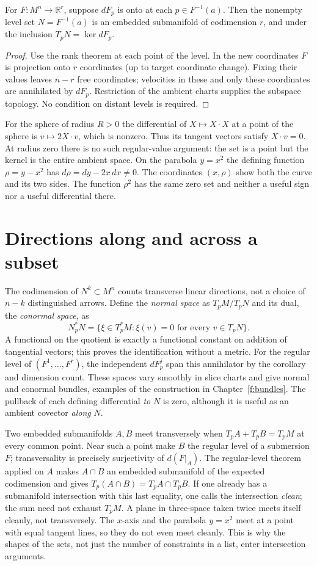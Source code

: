 \begin{corollary}\label{f:regular-value}
For $F:M^n\to\mathbb R^r$, suppose $dF_p$ is onto at each $p\in F^{-1}(a)$. Then the nonempty level set $N=F^{-1}(a)$ is an embedded submanifold of codimension $r$, and under the inclusion $T_pN=\ker dF_p$.
\end{corollary}
\begin{proof}
Use the rank theorem at each point of the level. In the new coordinates $F$ is projection onto $r$ coordinates (up to target coordinate change). Fixing their values leaves $n-r$ free coordinates; velocities in these and only these coordinates are annihilated by $dF_p$. Restriction of the ambient charts supplies the subspace topology. No condition on distant levels is required.
\end{proof}
For the sphere of radius $R>0$ the differential of $X\mapsto X\cdot X$ at a point of the sphere is $v\mapsto2X\cdot v$, which is nonzero. Thus its tangent vectors satisfy $X\cdot v=0$. At radius zero there is no such regular-value argument: the set is a point but the kernel is the entire ambient space. On the parabola $y=x^2$ the defining function $\rho=y-x^2$ has $d\rho=dy-2x\,dx\ne0$. The coordinates $(x,\rho)$ show both the curve and its two sides. The function $\rho^2$ has the same zero set and neither a useful sign nor a useful differential there.

\section{Directions along and across a subset}\label{f:normal}
The codimension of $N^k\subset M^n$ counts transverse linear directions, not a choice of $n-k$ distinguished arrows. Define the \emph{normal space} as $T_pM/T_pN$ and its dual, the \emph{conormal space}, as
\[
 N^*_pN=\{\xi\in T_p^*M:\xi(v)=0\text{ for every }v\in T_pN\} .
\]
A functional on the quotient is exactly a functional constant on addition of tangential vectors; this proves the identification without a metric. For the regular level of $(F^1,\ldots,F^r)$, the independent $dF^j_p$ span this annihilator by the corollary and dimension count. These spaces vary smoothly in slice charts and give normal and conormal bundles, examples of the construction in Chapter~\ref{f:bundles}. The pullback of each defining differential \emph{to} $N$ is zero, although it is useful as an ambient covector \emph{along} $N$.

Two embedded submanifolds $A,B$ meet transversely when $T_pA+T_pB=T_pM$ at every common point. Near such a point make $B$ the regular level of a submersion $F$; transversality is precisely surjectivity of $d(F|_A)$. The regular-level theorem applied on $A$ makes $A\cap B$ an embedded submanifold of the expected codimension and gives $T_p(A\cap B)=T_pA\cap T_pB$. If one already has a submanifold intersection with this last equality, one calls the intersection \emph{clean}; the sum need not exhaust $T_pM$. A plane in three-space taken twice meets itself cleanly, not transversely. The $x$-axis and the parabola $y=x^2$ meet at a point with equal tangent lines, so they do not even meet cleanly. This is why the shapes of the sets, not just the number of constraints in a list, enter intersection arguments.


